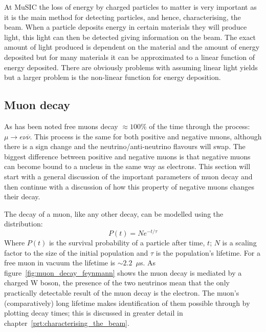 At MuSIC the loss of energy by charged particles to matter is very important as it is the main method for detecting particles, and hence, characterising, the beam. When a particle deposits energy in certain materials they will produce light, this light can then be detected giving information on the beam. The exact amount of light produced is dependent on the material and the amount of energy deposited but for many materials it can be approximated to a linear function of energy deposited. There are obviously problems with assuming linear light yields but a larger problem is the non-linear function for energy deposition. 


\subsection{Muon decay} %
\label{sec:muon_decay}
As has been noted free muons decay \(\approx100\)\% of the time through the process: \( \mu \rightarrow e \nu \overline{\nu}  \). This process is the same for both positive and negative muons, although there is a sign change and the neutrino/anti-neutrino flavours will swap. The biggest difference between positive and negative muons is that negative muons can become bound to a nucleus in the same way as electrons. This section will start with a general discussion of the important parameters of muon decay and then continue with a discussion of how this property of negative muons changes their decay.

The decay of a muon, like any other decay, can be modelled using the distribution:
\begin{equation}\label{eq:poisson}
  P(t) = Ne^{-t/\tau}
\end{equation}
Where \( P(t) \) is the survival probability of a particle after time, \( t \); \( N \) is a scaling factor to the size of the initial population and \( \tau \) is the population's lifetime. For a free muon in vacuum the lifetime is \( \sim2.2\)~\( \mu \)s. As figure~\ref{fig:muon_decay_feynmann} shows the muon decay is mediated by a charged W boson, the presence of the two neutrinos mean that the only practically detectable result of the muon decay is the electron. The muon's (comparatively) long lifetime makes identification of them possible through by plotting decay times; this is discussed in greater detail in chapter~\ref{prt:characterising_the_beam}.

